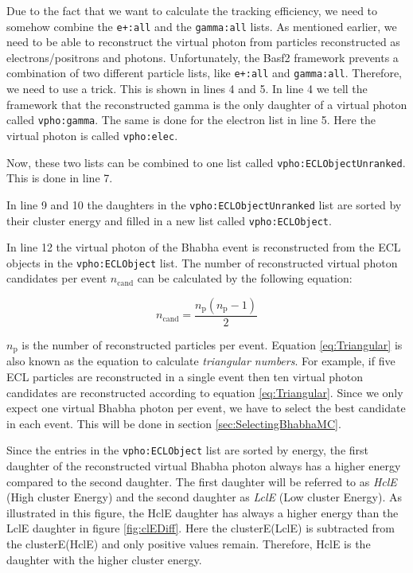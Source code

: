 \documentclass[a4paper,11pt,twosided,final,german,openbib,pdftex,listof=totoc,bibliography=totoc]{scrbook}
\begin{document}
Due to the fact that we want to calculate the tracking efficiency, we need to somehow combine the \texttt{e+:all} and the \texttt{gamma:all} lists. As mentioned earlier, we need to be able to reconstruct the virtual photon from particles reconstructed as electrons/positrons and photons.
Unfortunately, the Basf2 framework prevents a combination of two different particle lists, like \texttt{e+:all} and \texttt{gamma:all}. Therefore, we need to use a trick. This is shown in lines 4 and 5. In line 4 we tell the framework that the reconstructed gamma is the only daughter of a virtual photon called \texttt{vpho:gamma}. The same is done for the electron list in line 5. Here the virtual photon is called \texttt{vpho:elec}. 

Now, these two lists can be combined to one list called \texttt{vpho:ECLObjectUnranked}. This is done in line 7.

In line 9 and 10 the daughters in the \texttt{vpho:ECLObjectUnranked} list are sorted by their cluster energy and filled in a new list called \texttt{vpho:ECLObject}.

In line 12 the virtual photon of the Bhabha event is reconstructed from the ECL objects in the \texttt{vpho:ECLObject} list. The number of reconstructed virtual photon candidates per event $n_{\textrm{cand}}$ can be calculated by the following equation\cite{triangular}:

\begin{equation}
n_{\textrm{cand}} = \frac{n_{\textrm{p}}(n_{\textrm{p}} -1)}{2}
\label{eq:Triangular}
\end{equation}

$n_{\textrm{p}}$ is the number of reconstructed particles per event. Equation \ref{eq:Triangular} is also known as the equation to calculate \textit{triangular numbers}. For example, if five ECL particles are reconstructed in a single event then ten virtual photon candidates are reconstructed according to equation \ref{eq:Triangular}. Since we only expect one virtual Bhabha photon per event, we have to select the best candidate in each event. This will be done in section \ref{sec:SelectingBhabhaMC}.

Since the entries in the \texttt{vpho:ECLObject} list are sorted by energy, the first daughter of the reconstructed virtual Bhabha photon always has a higher energy compared to the second daughter. The first daughter will be referred to as \textit{HclE} (High cluster Energy) and the second daughter as \textit{LclE} (Low cluster Energy). As illustrated in this figure, the HclE daughter has always a higher energy than the LclE daughter in figure \ref{fig:clEDiff}. Here the clusterE(LclE) is subtracted from the clusterE(HclE) and only positive values remain. Therefore, HclE is the daughter with the higher cluster energy.
\end{document}
